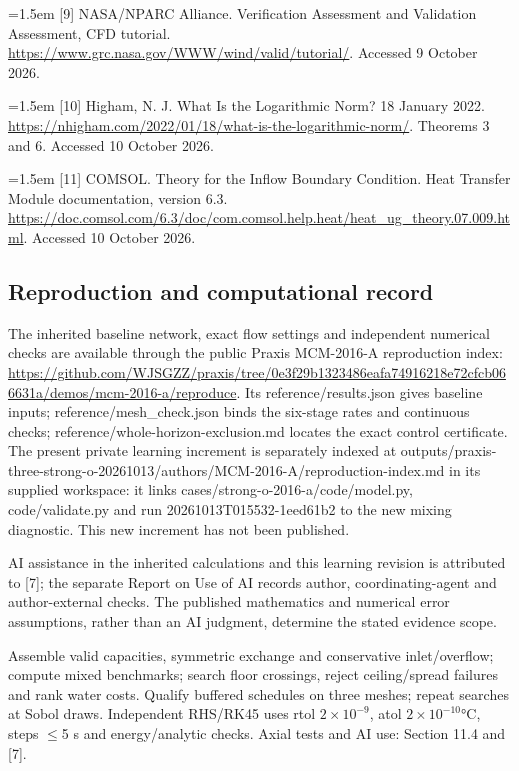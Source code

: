 \documentclass[12pt,a4paper]{article}
\begin{document}
\begingroup\normalsize\setlength{\parindent}{0pt}\hangindent=1.5em [9] NASA/NPARC Alliance. Verification Assessment and Validation Assessment, CFD tutorial. \url{https://www.grc.nasa.gov/WWW/wind/valid/tutorial/}. Accessed 9 October 2026.\par\endgroup
\begingroup\normalsize\setlength{\parindent}{0pt}\hangindent=1.5em [10] Higham, N. J. What Is the Logarithmic Norm? 18 January 2022. \url{https://nhigham.com/2022/01/18/what-is-the-logarithmic-norm/}. Theorems 3 and 6. Accessed 10 October 2026.\par\endgroup
\begingroup\normalsize\setlength{\parindent}{0pt}\hangindent=1.5em [11] COMSOL. Theory for the Inflow Boundary Condition. Heat Transfer Module documentation, version 6.3. \url{https://doc.comsol.com/6.3/doc/com.comsol.help.heat/heat_ug_theory.07.009.html}. Accessed 10 October 2026.\par\endgroup
\subsection*{Reproduction and computational record}
The inherited baseline network, exact flow settings and independent numerical checks are available through the public Praxis MCM-2016-A reproduction index: \url{https://github.com/WJSGZZ/praxis/tree/0e3f29b1323486eafa74916218e72cfcb066631a/demos/mcm-2016-a/reproduce}. Its reference/results.json gives baseline inputs; reference/mesh\_check.json binds the six-stage rates and continuous checks; reference/whole-horizon-exclusion.md locates the exact control certificate. The present private learning increment is separately indexed at outputs/praxis-three-strong-o-20261013/authors/MCM-2016-A/reproduction-index.md in its supplied workspace: it links cases/strong-o-2016-a/code/model.py, code/validate.py and run 20261013T015532-1eed61b2 to the new mixing diagnostic. This new increment has not been published.

AI assistance in the inherited calculations and this learning revision is attributed to [7]; the separate Report on Use of AI records author, coordinating-agent and author-external checks. The published mathematics and numerical error assumptions, rather than an AI judgment, determine the stated evidence scope.

Assemble valid capacities, symmetric exchange and conservative inlet/overflow; compute mixed benchmarks; search floor crossings, reject ceiling/spread failures and rank water costs. Qualify buffered schedules on three meshes; repeat searches at Sobol draws. Independent RHS/RK45 uses rtol $2\times10^{-9}$, atol $2\times10^{-10}$°C, steps $\leq$5 s and energy/analytic checks. Axial tests and AI use: Section 11.4 and [7].
\end{document}
